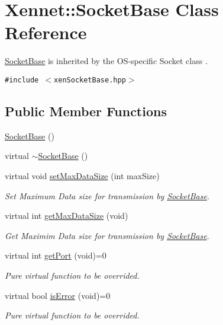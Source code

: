 \hypertarget{classXennet_1_1SocketBase}{
\section{Xennet::SocketBase Class Reference}
\label{classXennet_1_1SocketBase}
}
\hyperlink{classXennet_1_1SocketBase}{SocketBase} is inherited by the OS-specific Socket class .  


{\tt \#include $<$xenSocketBase.hpp$>$}

\subsection*{Public Member Functions}
\begin{CompactItemize}
\item 
\hyperlink{classXennet_1_1SocketBase_de4341bc034247a1ef5620914613ebbc}{SocketBase} ()
\item 
virtual \hyperlink{classXennet_1_1SocketBase_7bd3b275e3e62943c9220e56b17e146a}{$\sim$SocketBase} ()
\item 
virtual void \hyperlink{classXennet_1_1SocketBase_cfa5e4a24d42a2f02a5426aa3658a24d}{setMaxDataSize} (int maxSize)
\begin{CompactList}\small\item\em Set Maximum Data size for transmission by \hyperlink{classXennet_1_1SocketBase}{SocketBase}. \item\end{CompactList}\item 
virtual int \hyperlink{classXennet_1_1SocketBase_feee0b760a929f4cdde223713ef701db}{getMaxDataSize} (void)
\begin{CompactList}\small\item\em Get Maximim Data size for transmission by \hyperlink{classXennet_1_1SocketBase}{SocketBase}. \item\end{CompactList}\item 
virtual int \hyperlink{classXennet_1_1SocketBase_7828be0b543226b668458390a294bf0d}{getPort} (void)=0
\begin{CompactList}\small\item\em Pure virtual function to be overrided. \item\end{CompactList}\item 
virtual bool \hyperlink{classXennet_1_1SocketBase_6639e3721fda60b5859f9c87c5a79d6a}{isError} (void)=0
\begin{CompactList}\small\item\em Pure virtual function to be overrided. \item\end{CompactList}\item 

\end{CompactItemize}
